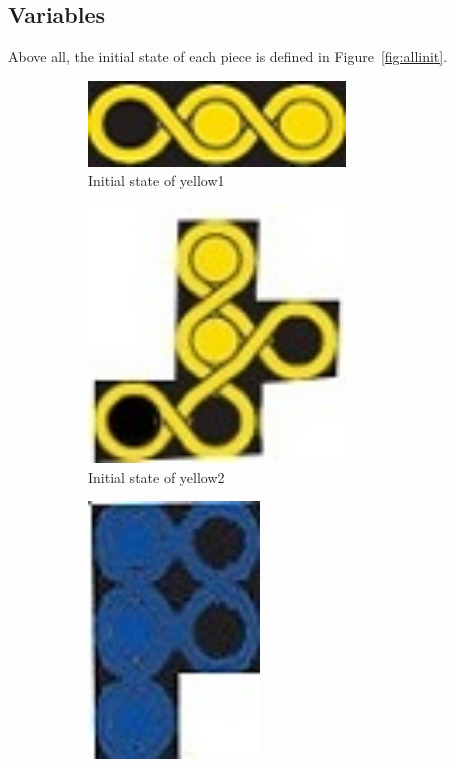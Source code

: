 \subsection{Variables}
Above all, the initial state of each piece is defined in Figure~\ref{fig:allinit}.
\begin{figure}[htbp]
\begin{subfigure}[b]{.24\textwidth}
\centering
\includegraphics[width=0.75\textwidth]{figs/yellow1.jpg}
\caption{Initial state of yellow1}
  \label{fig:2Dyellow1}
\end{subfigure}
\begin{subfigure}[b]{.24\textwidth}
\centering
\includegraphics[width=0.75\textwidth]{figs/yellow2.jpg}
\caption{Initial state of yellow2}
  \label{fig:2Dyellow2}
\end{subfigure}
\begin{subfigure}[b]{.24\textwidth}
\centering
\includegraphics[width =0.5\textwidth]{figs/blue1.jpg}

\end{subfigure}
\end{figure}
